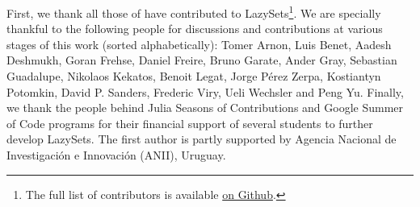 First, we thank all those of have contributed to LazySets\footnote{The full list of contributors is available \href{https://github.com/JuliaReach/LazySets.jl/graphs/contributors}{on Github}.}.
%
We are specially thankful to the following people for discussions and contributions at various stages of this work (sorted alphabetically): Tomer Arnon, Luis Benet, Aadesh Deshmukh, Goran Frehse, Daniel Freire, Bruno Garate, Ander Gray, Sebastian Guadalupe, Nikolaos Kekatos, Benoit Legat, Jorge P\'{e}rez Zerpa, Kostiantyn Potomkin, David P. Sanders, Frederic Viry, Ueli Wechsler and Peng Yu.
%
Finally, we thank the people behind Julia Seasons of Contributions and Google Summer of Code programs for their financial support of several students to further develop LazySets.
%
The first author is partly supported by Agencia Nacional de Investigaci\'{o}n e Innovaci\'{o}n (ANII), Uruguay.
